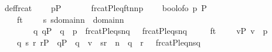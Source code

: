 \begin{isabellebody}
\ def{\isacharunderscore}{\kern0pt}frc{\isacharunderscore}{\kern0pt}at\ {\isacharcolon}{\kern0pt}\isanewline
\ \ \ {\isachardoublequoteopen}p{\isasymin}P{\isachardoublequoteclose}\isanewline
\ \ \isanewline
\ \ \ \ {\isachardoublequoteopen}frc{\isacharunderscore}{\kern0pt}at{\isacharparenleft}{\kern0pt}P{\isacharcomma}{\kern0pt}leq{\isacharcomma}{\kern0pt}{\isasymlangle}ft{\isacharcomma}{\kern0pt}n{}{\isacharcomma}{\kern0pt}n{}{\isacharcomma}{\kern0pt}p{\isasymrangle}{\isacharparenright}{\kern0pt}\ {\isacharequal}{\kern0pt}\isanewline
\ \ \ bool{\isacharunderscore}{\kern0pt}of{\isacharunderscore}{\kern0pt}o{\isacharparenleft}{\kern0pt}\ p\ {\isasymin}P\ {\isasymand}\isanewline
\ \ {\isacharparenleft}{\kern0pt}\ \ ft\ {\isacharequal}{\kern0pt}\ {}\ {\isasymand}\ \ {\isacharparenleft}{\kern0pt}{\isasymforall}s{\isachardot}{\kern0pt}\ s{\isasymin}domain{\isacharparenleft}{\kern0pt}n{}{\isacharparenright}{\kern0pt}\ {\isasymunion}\ domain{\isacharparenleft}{\kern0pt}n{}{\isacharparenright}{\kern0pt}\ {\isasymlongrightarrow}\isanewline
\ \ \ \ \ \ \ \ {\isacharparenleft}{\kern0pt}{\isasymforall}q{\isachardot}{\kern0pt}\ q{\isasymin}P\ {\isasymand}\ q\ {\isasympreceq}\ p\ {\isasymlongrightarrow}\ {\isacharparenleft}{\kern0pt}frc{\isacharunderscore}{\kern0pt}at{\isacharparenleft}{\kern0pt}P{\isacharcomma}{\kern0pt}leq{\isacharcomma}{\kern0pt}{\isasymlangle}{}{\isacharcomma}{\kern0pt}s{\isacharcomma}{\kern0pt}n{}{\isacharcomma}{\kern0pt}q{\isasymrangle}{\isacharparenright}{\kern0pt}\ {\isacharequal}{\kern0pt}{}\ {\isasymlongleftrightarrow}\ frc{\isacharunderscore}{\kern0pt}at{\isacharparenleft}{\kern0pt}P{\isacharcomma}{\kern0pt}leq{\isacharcomma}{\kern0pt}{\isasymlangle}{}{\isacharcomma}{\kern0pt}s{\isacharcomma}{\kern0pt}n{}{\isacharcomma}{\kern0pt}q{\isasymrangle}{\isacharparenright}{\kern0pt}\ {\isacharequal}{\kern0pt}{}{\isacharparenright}{\kern0pt}{\isacharparenright}{\kern0pt}{\isacharparenright}{\kern0pt}\isanewline
\ \ \ {\isasymor}\ ft\ {\isacharequal}{\kern0pt}\ {}\ {\isasymand}\ {\isacharparenleft}{\kern0pt}\ {\isasymforall}v{\isasymin}P{\isachardot}{\kern0pt}\ v\ {\isasympreceq}\ p\ {\isasymlongrightarrow}\isanewline
\ \ \ \ {\isacharparenleft}{\kern0pt}{\isasymexists}q{\isachardot}{\kern0pt}\ {\isasymexists}s{\isachardot}{\kern0pt}\ {\isasymexists}r{\isachardot}{\kern0pt}\ r{\isasymin}P\ {\isasymand}\ q{\isasymin}P\ {\isasymand}\ q\ {\isasympreceq}\ v\ {\isasymand}\ {\isasymlangle}s{\isacharcomma}{\kern0pt}r{\isasymrangle}\ {\isasymin}\ n{}\ {\isasymand}\ q\ {\isasympreceq}\ r\ {\isasymand}\ \ frc{\isacharunderscore}{\kern0pt}at{\isacharparenleft}{\kern0pt}P{\isacharcomma}{\kern0pt}leq{\isacharcomma}{\kern0pt}{\isasymlangle}{}{\isacharcomma}{\kern0pt}n{}{\isacharcomma}{\kern0pt}s{\isacharcomma}{\kern0pt}q{\isasymrangle}{\isacharparenright}{\kern0pt}\ {\isacharequal}{\kern0pt}\ {}{\isacharparenright}{\kern0pt}{\isacharparenright}{\kern0pt}{\isacharparenright}{\kern0pt}{\isacharparenright}{\kern0pt}{\isachardoublequoteclose}\isanewline

\end{isabellebody}
